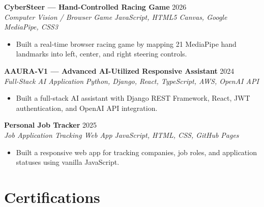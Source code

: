 \documentclass[10pt, letterpaper]{article}
\begin{document}
\vspace{3pt}

\noindent
\textbf{CyberSteer — Hand-Controlled Racing Game} \hfill 2026 \\
\textit{Computer Vision / Browser Game} \hfill \textit{JavaScript, HTML5 Canvas, Google MediaPipe, CSS3}
\begin{itemize}
  \item Built a real-time browser racing game by mapping 21 MediaPipe hand landmarks into left, center, and right steering controls.
\end{itemize}

\vspace{3pt}

\noindent
\textbf{AAURA-V1 — Advanced AI-Utilized Responsive Assistant} \hfill 2024 \\
\textit{Full-Stack AI Application} \hfill \textit{Python, Django, React, TypeScript, AWS, OpenAI API}
\begin{itemize}
  \item Built a full-stack AI assistant with Django REST Framework, React, JWT authentication, and OpenAI API integration.
\end{itemize}

\vspace{3pt}

\noindent
\textbf{Personal Job Tracker} \hfill 2025 \\
\textit{Job Application Tracking Web App} \hfill \textit{JavaScript, HTML, CSS, GitHub Pages}
\begin{itemize}
  \item Built a responsive web app for tracking companies, job roles, and application statuses using vanilla JavaScript.
\end{itemize}

\vspace{2pt}

\section{Certifications}

\begin{itemize}[leftmargin=*, label={}]

\end{itemize}
\end{document}
